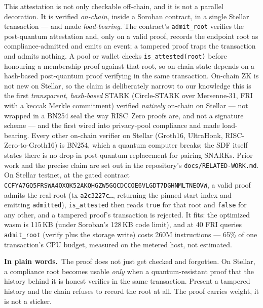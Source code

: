 \documentclass[11pt]{article}
\newcommand{\intuition}[1]{%
  \par\vspace{0.5em}%
  \noindent\colorbox{soft}{\parbox{\dimexpr\linewidth-2\fboxsep}{%
  \small\textbf{\color{klein}In plain words.}\ #1}}%
  \par\vspace{0.5em}%
}
\newcommand{\code}[1]{\texttt{\small #1}}
\begin{document}
This attestation is not only checkable off-chain, and it is not a parallel
decoration. It is verified \emph{on-chain}, inside a Soroban contract, in a
single Stellar transaction --- and made \emph{load-bearing}. The contract's
\code{admit\_root} verifies the post-quantum attestation and, only on a valid
proof, records the endpoint root as compliance-admitted and emits an event; a
tampered proof traps the transaction and admits nothing. A pool or wallet checks
\code{is\_attested(root)} before honouring a membership proof against that root,
so on-chain state depends on a hash-based post-quantum proof verifying in the
same transaction. On-chain ZK is not new on Stellar, so the claim is deliberately
narrow: to our knowledge this is the first \emph{transparent, hash-based} STARK
(Circle-STARK over Mersenne-31, FRI with a keccak Merkle commitment) verified
\emph{natively} on-chain on Stellar --- not wrapped in a BN254 seal the way
RISC~Zero proofs are, and not a signature scheme --- and the first wired into
privacy-pool compliance and made load-bearing. Every other on-chain verifier on
Stellar (Groth16, UltraHonk, RISC-Zero-to-Groth16) is BN254, which a quantum
computer breaks; the SDF itself states there is no drop-in post-quantum
replacement for pairing SNARKs. Prior work and the precise claim are set out in
the repository's \code{docs/RELATED-WORK.md}. On Stellar testnet, at the gated contract
\code{CCFYA7GQ5FRSWA4OXQK52AKQHGZW5GQCDCCOE6VLGDT7DGHNMLTNEOVW}, a valid proof
admits the real root (tx \code{a2c3227c\dots}, returning the pinned start index and emitting
\code{admitted}), \code{is\_attested} then reads \code{true} for that root and
\code{false} for any other, and a tampered proof's transaction is rejected. It
fits: the optimized wasm is 115\,KB (under Soroban's 128\,KB code limit), and at
40 FRI queries \code{admit\_root} (verify plus the storage write) costs 260M
instructions --- 65\% of one transaction's CPU budget, measured on the metered
host, not estimated.

\intuition{The proof does not just get checked and forgotten. On Stellar, a
compliance root becomes usable \emph{only} when a quantum-resistant proof that
the history behind it is honest verifies in the same transaction. Present a
tampered history and the chain refuses to record the root at all. The proof
carries weight, it is not a sticker.}
\end{document}
